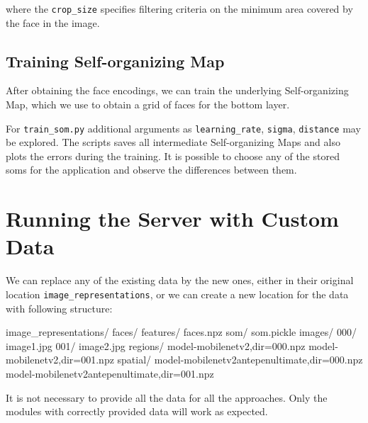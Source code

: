 where the \verb+crop_size+ specifies filtering criteria on the minimum area covered by the face in the image.

\subsection{Training Self-organizing Map}

After obtaining the face encodings, we can train the underlying Self-organizing Map, which we use to obtain a grid of faces for the bottom layer.


\vspace{0.5cm}
\vspace{0.5cm}

For \verb+train_som.py+ additional arguments as \verb+learning_rate+, \verb+sigma+, \verb+distance+ may be explored. The scripts saves all intermediate Self-organizing Maps and also plots the errors during the training. It is possible to choose any of the stored \acrshort{som}s for the application and observe the differences between them.

\section{Running the Server with Custom Data}
\label{s:dir_structure}

We can replace any of the existing data by the new ones, either in their original location \verb+image_representations+, or we can create a new location for the data with following structure:


\vspace{0.5cm}
\begin{boxedverbatim}
image_representations/
    faces/
        features/
            faces.npz
        som/
            som.pickle
    images/
        000/
            image1.jpg
        001/
            image2.jpg
    regions/
        model-mobilenetv2,dir=000.npz
        model-mobilenetv2,dir=001.npz
    spatial/
        model-mobilenetv2antepenultimate,dir=000.npz
        model-mobilenetv2antepenultimate,dir=001.npz
\end{boxedverbatim}
\vspace{0.5cm}

It is not necessary to provide all the data for all the approaches. Only the modules with correctly provided data will work as expected.

